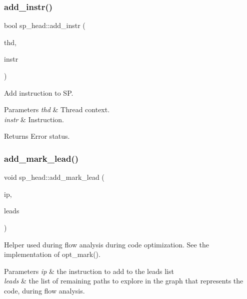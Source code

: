 \subsubsection{\texorpdfstring{add\+\_\+instr()}{add\_instr()}}
{\footnotesize\ttfamily bool sp\+\_\+head\+::add\+\_\+instr (\begin{DoxyParamCaption}\item[{T\+HD $\ast$}]{thd,  }\item[{\mbox{\hyperlink{classsp__instr}{sp\+\_\+instr}} $\ast$}]{instr }\end{DoxyParamCaption})}

Add instruction to SP.


\begin{DoxyParams}{Parameters}
{\em thd} & Thread context. \\
\hline
{\em instr} & Instruction.\\
\hline
\end{DoxyParams}
\begin{DoxyReturn}{Returns}
Error status. 
\end{DoxyReturn}
\mbox{\label{classsp__head_ab590080fc066fab935e9e2bdbc66f2f0}} 
\subsubsection{\texorpdfstring{add\+\_\+mark\+\_\+lead()}{add\_mark\_lead()}}
{\footnotesize\ttfamily void sp\+\_\+head\+::add\+\_\+mark\+\_\+lead (\begin{DoxyParamCaption}\item[{uint}]{ip,  }\item[{\mbox{\hyperlink{classList}{List}}$<$ \mbox{\hyperlink{classsp__instr}{sp\+\_\+instr}} $>$ $\ast$}]{leads }\end{DoxyParamCaption})}

Helper used during flow analysis during code optimization. See the implementation of {\ttfamily opt\+\_\+mark()}. 
\begin{DoxyParams}{Parameters}
{\em ip} & the instruction to add to the leads list \\
\hline
{\em leads} & the list of remaining paths to explore in the graph that represents the code, during flow analysis. \\
\hline
\end{DoxyParams}
\mbox{\label{classsp__head_a9a86bedc4044da075fa749aa34c6e866}} 
